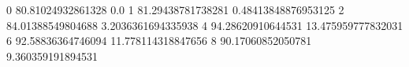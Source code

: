 0 80.81024932861328 0.0
1 81.29438781738281 0.48413848876953125
2 84.01388549804688 3.2036361694335938
4 94.28620910644531 13.475959777832031
6 92.58836364746094 11.778114318847656
8 90.17060852050781 9.360359191894531
